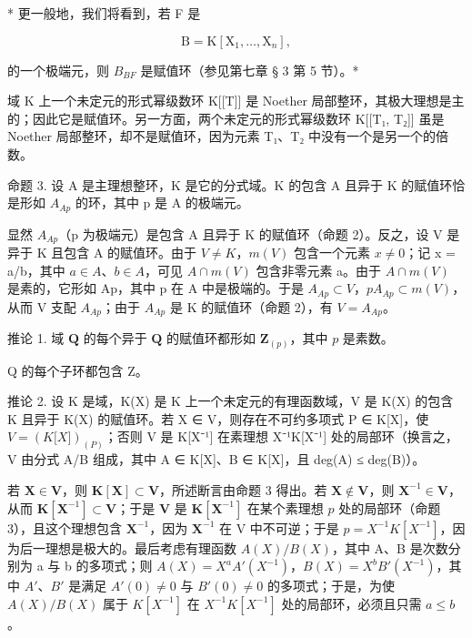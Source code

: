 * 更一般地，我们将看到，若 F 是

\[
\mathrm{B} = \mathrm{K} [ \mathrm{X} _ {1}, \dots , \mathrm{X} _ {n} ],
\]

的一个极端元，则 \(B_{BF}\) 是赋值环（参见第七章 § 3 第 5 节）。*

域 K 上一个未定元的形式幂级数环 K{[}{[}T{]}{]} 是 Noether 局部整环，其极大理想是主的；因此它是赋值环。另一方面，两个未定元的形式幂级数环 K{[}{[}T₁, T₂{]}{]} 虽是 Noether 局部整环，却不是赋值环，因为元素 T₁、T₂ 中没有一个是另一个的倍数。

命题 3. 设 A 是主理想整环，K 是它的分式域。K 的包含 A 且异于 K 的赋值环恰是形如 \(A_{Ap}\) 的环，其中 p 是 A 的极端元。

显然 \(A_{Ap}\)（p 为极端元）是包含 A 且异于 K 的赋值环（命题 2）。反之，设 V 是异于 K 且包含 A 的赋值环。由于 \(V \neq K\)，\(m(V)\) 包含一个元素 \(x \neq 0\)；记 x = a/b，其中 \(a \in A\)、\(b \in A\)，可见 \(A \cap m(V)\) 包含非零元素 a。由于 \(A \cap m(V)\) 是素的，它形如 Ap，其中 p 在 A 中是极端的。于是 \(A_{Ap} \subset V\)，\(pA_{Ap} \subset m(V)\)，从而 V 支配 \(A_{Ap}\)；由于 \(A_{Ap}\) 是 K 的赋值环（命题 2），有 \(V = A_{Ap}\)。

推论 1. 域 \(\mathbf{Q}\) 的每个异于 \(\mathbf{Q}\) 的赋值环都形如 \(\mathbf{Z}_{(p)}\)，其中 \(p\) 是素数。

Q 的每个子环都包含 Z。

推论 2. 设 K 是域，K(X) 是 K 上一个未定元的有理函数域，V 是 K(X) 的包含 K 且异于 K(X) 的赋值环。若 X ∈ V，则存在不可约多项式 P ∈ K{[}X{]}，使 \(V = (K{[}X{]})_{(P)}\)；否则 V 是 K{[}X⁻¹{]} 在素理想 X⁻¹K{[}X⁻¹{]} 处的局部环（换言之，V 由分式 A/B 组成，其中 A ∈ K{[}X{]}、B ∈ K{[}X{]}，且 deg(A) ≤ deg(B)）。

若 \(\mathbf{X} \in \mathbf{V}\)，则 \(\mathbf{K}[\mathbf{X}] \subset \mathbf{V}\)，所述断言由命题 3 得出。若 \(\mathbf{X} \notin \mathbf{V}\)，则 \(\mathbf{X}^{-1} \in \mathbf{V}\)，从而 \(\mathbf{K}[\mathbf{X}^{-1}] \subset \mathbf{V}\)；于是 \(\mathbf{V}\) 是 \(\mathbf{K}[\mathbf{X}^{-1}]\) 在某个素理想 \(p\) 处的局部环（命题 3），且这个理想包含 \(\mathbf{X}^{-1}\)，因为 \(\mathbf{X}^{-1}\) 在 V 中不可逆；于是 \(p = X^{-1}K[X^{-1}]\)，因为后一理想是极大的。最后考虑有理函数 \(A(X)/B(X)\)，其中 A、B 是次数分别为 a 与 b 的多项式；则 \(A(X) = X^{a}A'(X^{-1})\)，\(B(X) = X^{b}B'(X^{-1})\)，其中 \(A'\)、\(B'\) 是满足 \(A'(0) \neq 0\) 与 \(B'(0) \neq 0\) 的多项式；于是，为使 \(A(X)/B(X)\) 属于 \(K[X^{-1}]\) 在 \(X^{-1}K[X^{-1}]\) 处的局部环，必须且只需 \(a \leqslant b\)。

